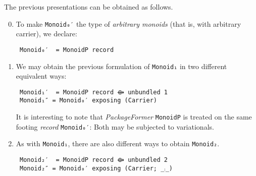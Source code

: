 \documentclass[sigplan,screen]{acmart}
\begin{document}
The previous presentations can be obtained as follows.

\begin{enumerate}
\setcounter{enumi}{-1}
\item To make \texttt{Monoid₀′} the type of \emph{arbitrary monoids}
(that is, with arbitrary carrier), we declare:
\vspace{0.3em}
\begin{verbatim}
 Monoid₀′  = MonoidP record
\end{verbatim}

\setcounter{enumi}{0}
\item We may obtain the previous formulation of
\texttt{Monoid₁} in two different equivalent ways:
\vspace{0.3em}
\begin{verbatim}
 Monoid₁′  = MonoidP record ⟴ unbundled 1
 Monoid₁″ = Monoid₀′ exposing (Carrier)
\end{verbatim}

\vspace{0.3em}
It is interesting to note that \emph{PackageFormer} \texttt{MonoidP} is treated on the same footing
\emph{record} \texttt{Monoid₀′}: Both may be subjected to variationals.
\end{enumerate}

\begin{enumerate}
\setcounter{enumi}{1}
\item As with \texttt{Monoid₁}, there are also different ways
to obtain \texttt{Monoid₂}.
\vspace{0.3em}
\begin{verbatim}
 Monoid₂′  = MonoidP record ⟴ unbundled 2
 Monoid₂″ = Monoid₀′ exposing (Carrier; _⨾_)
\end{verbatim}

\vspace{0.3em}
\end{enumerate}
\end{document}
